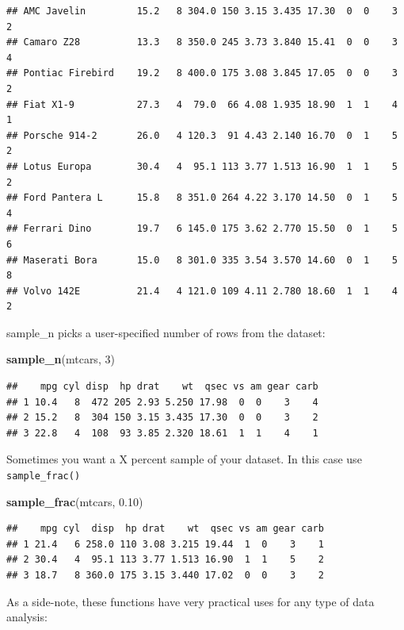 \documentclass[]{book}
\newenvironment{Shaded}{\begin{snugshade}}{\end{snugshade}}
\newcommand{\KeywordTok}[1]{\textcolor[rgb]{0.13,0.29,0.53}{\textbf{#1}}}
\newcommand{\DecValTok}[1]{\textcolor[rgb]{0.00,0.00,0.81}{#1}}
\newcommand{\FloatTok}[1]{\textcolor[rgb]{0.00,0.00,0.81}{#1}}
\newcommand{\NormalTok}[1]{#1}
\theoremstyle{definition}
\theoremstyle{definition}
\theoremstyle{definition}
\theoremstyle{remark}
\begin{document}
\begin{verbatim}
## AMC Javelin         15.2   8 304.0 150 3.15 3.435 17.30  0  0    3    2
## Camaro Z28          13.3   8 350.0 245 3.73 3.840 15.41  0  0    3    4
## Pontiac Firebird    19.2   8 400.0 175 3.08 3.845 17.05  0  0    3    2
## Fiat X1-9           27.3   4  79.0  66 4.08 1.935 18.90  1  1    4    1
## Porsche 914-2       26.0   4 120.3  91 4.43 2.140 16.70  0  1    5    2
## Lotus Europa        30.4   4  95.1 113 3.77 1.513 16.90  1  1    5    2
## Ford Pantera L      15.8   8 351.0 264 4.22 3.170 14.50  0  1    5    4
## Ferrari Dino        19.7   6 145.0 175 3.62 2.770 15.50  0  1    5    6
## Maserati Bora       15.0   8 301.0 335 3.54 3.570 14.60  0  1    5    8
## Volvo 142E          21.4   4 121.0 109 4.11 2.780 18.60  1  1    4    2
\end{verbatim}

sample\_n picks a user-specified number of rows from the dataset:

\begin{Shaded}
\begin{Highlighting}[]
\KeywordTok{sample_n}\NormalTok{(mtcars, }\DecValTok{3}\NormalTok{)}
\end{Highlighting}
\end{Shaded}

\begin{verbatim}
##    mpg cyl disp  hp drat    wt  qsec vs am gear carb
## 1 10.4   8  472 205 2.93 5.250 17.98  0  0    3    4
## 2 15.2   8  304 150 3.15 3.435 17.30  0  0    3    2
## 3 22.8   4  108  93 3.85 2.320 18.61  1  1    4    1
\end{verbatim}

Sometimes you want a X percent sample of your dataset. In this case use
\texttt{sample\_frac()}

\begin{Shaded}
\begin{Highlighting}[]
\KeywordTok{sample_frac}\NormalTok{(mtcars, }\FloatTok{0.10}\NormalTok{)}
\end{Highlighting}
\end{Shaded}

\begin{verbatim}
##    mpg cyl  disp  hp drat    wt  qsec vs am gear carb
## 1 21.4   6 258.0 110 3.08 3.215 19.44  1  0    3    1
## 2 30.4   4  95.1 113 3.77 1.513 16.90  1  1    5    2
## 3 18.7   8 360.0 175 3.15 3.440 17.02  0  0    3    2
\end{verbatim}

As a side-note, these functions have very practical uses for any type of
data analysis:
\end{document}
